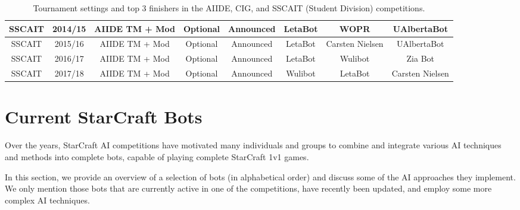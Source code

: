 \begin{table}[t]
\begin{center}
\begin{tabular} {| c | c | c c c | c c c |}
 \hline
 SSCAIT & 2014/15 & AIIDE TM + Mod & Optional & Announced & LetaBot & WOPR & UAlbertaBot\\
 \hline
 SSCAIT & 2015/16 & AIIDE TM + Mod & Optional & Announced & LetaBot & Carsten Nielsen & UAlbertaBot \\
 \hline
 SSCAIT & 2016/17 & AIIDE TM + Mod & Optional & Announced & LetaBot & Wulibot & Zia Bot\\
 \hline
 SSCAIT & 2017/18 & AIIDE TM + Mod & Optional & Announced & Wulibot & LetaBot & Carsten Nielsen\\
 \hline
 \end{tabular}
 \end{center}  
 \caption{Tournament settings and top 3 finishers in the AIIDE, CIG, and SSCAIT (Student Division) competitions.}
 \label{tableTournaments}
\end{table} 

\section{Current StarCraft Bots}\label{secBots}

Over the years, StarCraft AI competitions have motivated many individuals and groups to combine and integrate various AI techniques and methods into complete bots, capable of playing complete StarCraft 1v1 games. 

In this section, we provide an overview of a selection of bots (in alphabetical order) and discuss some of the AI approaches they implement. We only mention those bots that are currently active in one of the competitions, have recently been updated, and employ some more complex AI techniques. 

